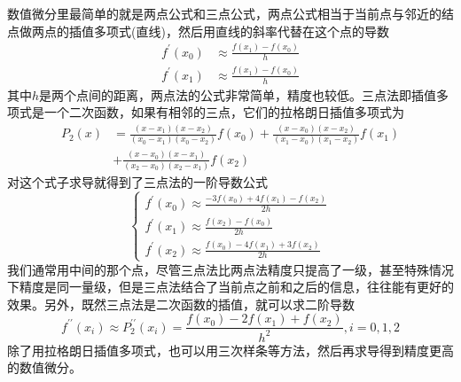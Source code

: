 \documentclass[12pt,a4paper,openany,twoside]{book}
\numberwithin{equation}{section}
\begin{document}
      数值微分里最简单的就是两点公式和三点公式，两点公式相当于当前点与邻近的结点做两点的插值多项式(直线)，然后用直线的斜率代替在这个点的导数
      \begin{equation}
        \begin{aligned} f^{\prime}\left(x_{0}\right) & \approx \frac{f\left(x_{1}\right)-f\left(x_{0}\right)}{h} \\ f^{\prime}\left(x_{1}\right) & \approx \frac{f\left(x_{1}\right)-f\left(x_{0}\right)}{h} \end{aligned}
      \end{equation}
      其中$h$是两个点间的距离，两点法的公式非常简单，精度也较低。三点法即插值多项式是一个二次函数，如果有相邻的三点，它们的拉格朗日插值多项式为
      \begin{equation*}
        \begin{aligned} P_{2}(x) &=\frac{\left(x-x_{1}\right)\left(x-x_{2}\right)}{\left(x_{0}-x_{1}\right)\left(x_{0}-x_{2}\right)} f\left(x_{0}\right)+\frac{\left(x-x_{0}\right)\left(x-x_{2}\right)}{\left(x_{1}-x_{0}\right)\left(x_{1}-x_{2}\right)} f\left(x_{1}\right) \\ &+\frac{\left(x-x_{0}\right)\left(x-x_{1}\right)}{\left(x_{2}-x_{0}\right)\left(x_{2}-x_{1}\right)} f\left(x_{2}\right) \end{aligned}
      \end{equation*}
      对这个式子求导就得到了三点法的一阶导数公式
      \begin{equation}
        \left\{\begin{array}{l}{f^{\prime}\left(x_{0}\right) \approx \frac{-3 f\left(x_{0}\right)+4 f\left(x_{1}\right)-f\left(x_{2}\right)}{2 h}} \\ {f^{\prime}\left(x_{1}\right) \approx \frac{f\left(x_{2}\right)-f\left(x_{0}\right)}{2 h}} \\ {f^{\prime}\left(x_{2}\right) \approx \frac{f\left(x_{0}\right)-4 f\left(x_{1}\right)+3 f\left(x_{2}\right)}{2 h}}\end{array}\right.
      \end{equation}
      我们通常用中间的那个点，尽管三点法比两点法精度只提高了一级，甚至特殊情况下精度是同一量级，但是三点法结合了当前点之前和之后的信息，往往能有更好的效果。另外，既然三点法是二次函数的插值，就可以求二阶导数
      \begin{equation}
        f^{\prime \prime}\left(x_{i}\right) \approx P_{2}^{\prime \prime}\left(x_{i}\right)=\frac{f\left(x_{0}\right)-2 f\left(x_{1}\right)+f\left(x_{2}\right)}{h^{2}}, i=0,1,2
      \end{equation}
      除了用拉格朗日插值多项式，也可以用三次样条等方法，然后再求导得到精度更高的数值微分。
\end{document}
